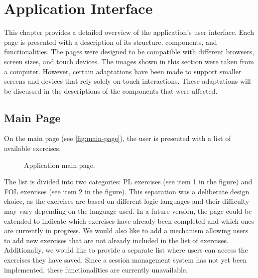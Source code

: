 %

\chapter{Application Interface}
\label{chap:ui}

This chapter provides a detailed overview of the application’s user interface. Each page is presented with a description of its structure, components, and functionalities. The pages were designed to be compatible with different browsers, screen sizes, and touch devices. The images shown in this section were taken from a computer. However, certain adaptations have been made to support smaller screens and devices that rely solely on touch interactions. These adaptations will be discussed in the descriptions of the components that were affected.


\section{Main Page}
On the main page (see \autoref{fig:main-page}), the user is presented with a list of available exercises. 

\begin{figure}[h]
    \centering
    \caption{Application main page.}
    \label{fig:main-page}
\end{figure}

The list is divided into two categories: \gls{PL} exercises (see item 1 in the figure) and \gls{FOL} exercises (see item 2 in the figure). This separation was a deliberate design choice, as the exercises are based on different logic languages and their difficulty may vary depending on the language used. In a future version, the page could be extended to indicate which exercises have already been completed and which ones are currently in progress. We would also like to add a mechanism allowing users to add new exercises that are not already included in the list of exercises. Additionally, we would like to provide a separate list where users can access the exercises they have saved. Since a session management system has not yet been implemented, these functionalities are currently unavailable.


